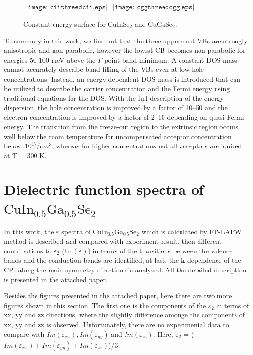 \documentclass[a4paper, 12pt, titlepage,oneside,drop]{kthesis}
\begin{document}
\begin{figure}[H]
\begin{center}$
\begin{array}{cc}
\texttt{[image: ciithreedcii.eps]} &
\texttt{[image: cggthreedcgg.eps]}
\end{array}$
\end{center}
\caption{Constant energy surface for ${\mathrm{ CuInSe_2}}$ and ${\mathrm{ CuGaSe_2}}$.}
\label{bbbbb}
\end{figure}


To summary in this work, we find out that the three uppermost VBs are strongly anisotropic and non-parabolic, however the lowest CB becomes non-parabolic for energies 50-100 meV
above the $\Gamma$-point band minimum. A constant DOS mass cannot accurately describe band filling of the VBs even at low hole concentrations. Instead, 
an energy dependent DOS mass is introduced that can be utilized to describe the carrier concentration and the Fermi energy using traditional equations for the DOS.
With the full description of the energy dispersion, the hole concentration is improved by a factor of 10–50 and the electron concentration is improved by a 
factor of 2–10 depending on quasi-Fermi energy. The transition from the freeze-out region to the extrinsic region occurs well below the room temperature for
uncompensated acceptor concentration below $~10^{17}$/$cm^3$, whereas for higher concentrations not all acceptors are ionized at T = 300 K. 

\section{Dielectric function spectra of $\mathrm {{Cu}{In}_{0.5}{Ga}_{0.5}{Se}_2}$}
In this work, the $\varepsilon$ spectra of $\mathrm {CuIn_{0.5}Ga_{0.5}Se_2}$ which is calculated by FP-LAPW method is described and compared with experiment
result, then different contributions to $\varepsilon_2$ (Im$(\varepsilon)$) in terms of the transitions between the valence bands and the conduction bands are identified, at last, 
the $\textbf{k}$-dependence of the CPs along the main symmetry directions is analyzed. All the detailed description is presented in the attached paper.

Besides the figures presented in the attached paper, here there are two more figures shown in this section. The first one is the components of the $\varepsilon_2$ in terms of
xx, yy and zz directions, where the slightly difference amonge the components of xx, yy and zz is observed. Unfortunately, there are no experimental data to compare with $Im(\varepsilon_{xx}), Im(\varepsilon_{yy})$ and $Im(\varepsilon_{zz})$. Here,
$\varepsilon_2$ = ($Im(\varepsilon_{xx}) + Im(\varepsilon_{yy}) + Im(\varepsilon_{zz}) )/3$. 
\end{document}

